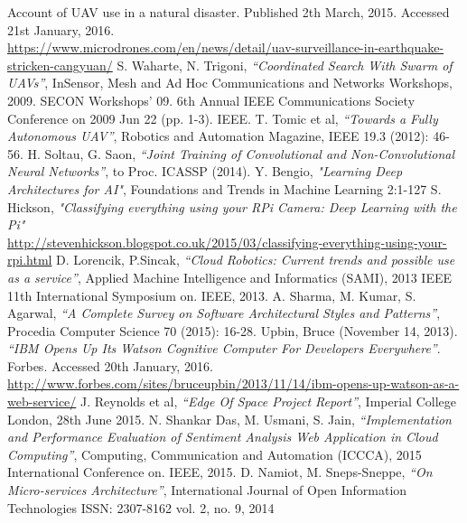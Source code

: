 \documentclass{article}
\begin{document}

\begin{thebibliography}{20}
    Account of UAV use in a natural disaster. Published 2th March, 2015. Accessed 21st January, 2016. \\
    \url{https://www.microdrones.com/en/news/detail/uav-surveillance-in-earthquake-stricken-cangyuan/}
    S. Waharte, N. Trigoni, \textit{``Coordinated Search With Swarm of UAVs''}, InSensor, Mesh and Ad Hoc Communications and Networks Workshops, 2009. SECON Workshops' 09. 6th Annual IEEE Communications Society Conference on 2009 Jun 22 (pp. 1-3). IEEE.
    T. Tomic et al, \textit{``Towards a Fully Autonomous UAV''}, Robotics and Automation Magazine, IEEE 19.3 (2012): 46-56.
    H. Soltau, G. Saon, \textit{``Joint Training of Convolutional and Non-Convolutional Neural Networks''}, to Proc. ICASSP (2014).
    Y. Bengio, \textit{"Learning Deep Architectures for AI"}, Foundations and Trends in Machine Learning 2:1-127
    S. Hickson, \textit{"Classifying everything using your RPi Camera: Deep Learning with the Pi"} \\
    \url{http://stevenhickson.blogspot.co.uk/2015/03/classifying-everything-using-your-rpi.html}
    D. Lorencik, P.Sincak, \textit{``Cloud Robotics: Current trends and possible use as a service''}, Applied Machine Intelligence and Informatics (SAMI), 2013 IEEE 11th International Symposium on. IEEE, 2013.
    A. Sharma, M. Kumar, S. Agarwal, \textit{``A Complete Survey on Software Architectural Styles and Patterns''}, Procedia Computer Science 70 (2015): 16-28.
    Upbin, Bruce (November 14, 2013). \textit{``IBM Opens Up Its Watson Cognitive Computer For Developers Everywhere''}. Forbes. Accessed 20th January, 2016. \\
    \url{http://www.forbes.com/sites/bruceupbin/2013/11/14/ibm-opens-up-watson-as-a-web-service/}
    J. Reynolds et al, \textit{``Edge Of Space Project Report''}, Imperial College London, 28th June 2015.
    N. Shankar Das, M. Usmani, S. Jain, \textit{``Implementation and Performance Evaluation of Sentiment Analysis Web Application in Cloud Computing''}, Computing, Communication and Automation (ICCCA), 2015 International Conference on. IEEE, 2015.
    D. Namiot, M. Sneps-Sneppe, \textit{``On Micro-services Architecture''}, International Journal of Open Information Technologies ISSN: 2307-8162 vol. 2, no. 9, 2014

\end{thebibliography}
\end{document}
